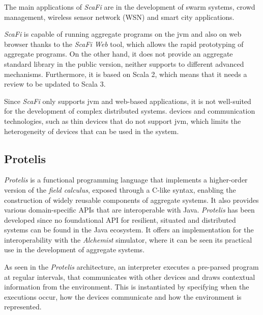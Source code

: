 The main applications of \emph{ScaFi} are in the development of swarm systems, crowd management, wireless sensor network (WSN)
and smart city applications.

\emph{ScaFi} is capable of running aggregate programs on the \ac{jvm} and also on web browser thanks
to the \emph{ScaFi Web} tool, which allows the rapid prototyping of aggregate programs.
On the other hand, it does not provide an aggregate standard library in the public version, neither supports to
different advanced mechanisms.
Furthermore, it is based on Scala 2, which means that it needs a review to be updated to Scala 3.

Since \emph{ScaFi} only supports \ac{jvm} and web-based applications, it is not well-suited for the development of complex distributed systems.
devices and communication technologies, such as thin devices that do not support \ac{jvm}, which limits the heterogeneity of
devices that can be used in the system.

\subsection{Protelis}
\label{subsec:protelis}
\emph{Protelis} is a functional programming language that implements a higher-order version of the \emph{field calculus},
exposed through a C-like syntax, enabling the construction of widely reusable components of aggregate systems.
It also provides various domain-specific APIs that are interoperable with Java.
\emph{Protelis} has been developed since no foundational API for resilient, situated and distributed systems can be found
in the Java ecosystem.
It offers an implementation for the interoperability with the \emph{Alchemist} simulator, where it can be seen its
practical use in the development of aggregate systems.


As seen in the \emph{Protelis} architecture, an interpreter executes a pre-parsed program at regular intervals,
that communicates with other devices and draws contextual information from the environment.
This is instantiated by specifying when the executions occur, how the devices communicate and how the environment is
represented.

